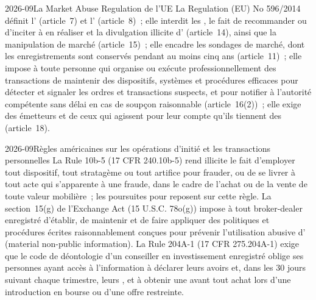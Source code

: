 \begin{dated}{2026-09}{La Market Abuse Regulation de l'UE}\label{dat:fm:compliance-and-market-abuse:mar}
La Regulation (EU) No 596/2014 définit l' (article~7) et l' (article~8)~; elle interdit les , le fait de recommander ou
d'inciter à en réaliser et la divulgation illicite d' (article~14), ainsi que la manipulation de marché (article~15)~; elle encadre les sondages de marché, dont les
enregistrements sont conservés pendant au moins cinq ans (article~11)~; elle impose à toute personne qui organise ou exécute professionnellement des transactions de maintenir
des dispositifs, systèmes et procédures efficaces pour détecter et signaler les ordres et transactions suspects, et pour notifier à l'autorité compétente
sans délai en cas de soupçon raisonnable (article~16(2))~; elle exige des émetteurs et de ceux qui agissent pour leur compte qu'ils tiennent des  (article~18).
\end{dated}

\begin{dated}{2026-09}{Règles américaines sur les opérations d'initié et les transactions personnelles}\label{dat:fm:compliance-and-market-abuse:us}
La Rule 10b-5 (17 CFR 240.10b-5) rend illicite le fait d'employer tout dispositif, tout stratagème ou tout artifice pour frauder, ou de se livrer à tout acte qui s'apparente à une
fraude, dans le cadre de l'achat ou de la vente de toute valeur mobilière~; les poursuites pour  reposent sur cette règle. La section~15(g) de l'Exchange Act (15
U.S.C. 78o(g)) impose à tout broker-dealer enregistré d'établir, de maintenir et de faire appliquer des politiques et procédures écrites raisonnablement conçues pour
prévenir l'utilisation abusive d' (material non-public information). La Rule 204A-1 (17 CFR 275.204A-1) exige que le code de déontologie d'un conseiller en investissement enregistré
oblige ses personnes ayant accès à l'information à déclarer leurs avoirs et, dans les 30 jours suivant chaque trimestre, leurs , et à obtenir
une  avant tout achat lors d'une introduction en bourse ou d'une offre restreinte.
\end{dated}

